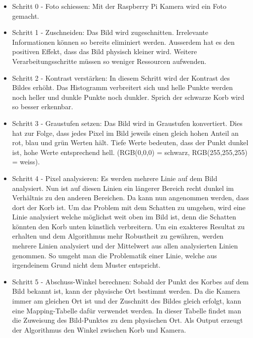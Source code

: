 \begin{itemize}
	\item Schritt 0 - Foto schiessen: Mit der Raspberry Pi Kamera wird ein Foto gemacht.
	
	\item Schritt 1 - Zuschneiden: Das Bild wird zugeschnitten. Irrelevante Informationen können so bereits eliminiert werden. Ausserdem hat es den positiven Effekt, dass das Bild physisch kleiner wird. Weitere Verarbeitungsschritte müssen so weniger Ressourcen aufwenden. 
	
	\item Schritt 2 - Kontrast verstärken: In diesem Schritt wird der Kontrast des Bildes erhöht. Das Histogramm verbreitert sich und helle Punkte werden noch heller und dunkle Punkte noch dunkler. Sprich der schwarze Korb wird so besser erkennbar. 
	
	\item Schritt 3 - Graustufen setzen: Das Bild wird in Graustufen konvertiert. Dies hat zur Folge, dass jedes Pixel im Bild jeweils einen gleich hohen Anteil an rot, blau und grün Werten hält. Tiefe Werte bedeuten, dass der Punkt dunkel ist, hohe Werte entsprechend hell. (RGB(0,0,0) = schwarz, RGB(255,255,255) = weiss).
	
	\item Schritt 4 - Pixel analysieren: Es werden mehrere Linie auf dem Bild analysiert. Nun ist auf diesen Linien ein längerer Bereich recht dunkel im Verhältnis zu den anderen Bereichen. Da kann nun angenommen werden, dass dort der Korb ist. Um das Problem mit dem Schatten zu umgehen, wird eine Linie analysiert welche möglichst weit oben im Bild ist, denn die Schatten könnten den Korb unten künstlich verbreitern. Um ein exakteres Resultat zu erhalten und dem Algorithmus mehr Robustheit zu gewähren, werden mehrere Linien analysiert und der Mittelwert aus allen analysierten Linien genommen. So umgeht man die Problematik einer Linie, welche aus irgendeinem Grund nicht dem Muster entspricht.
	
	\item Schritt 5 - Abschuss-Winkel berechnen: Sobald der Punkt des Korbes auf dem Bild bekannt ist, kann der physische Ort bestimmt werden. Da die Kamera immer am gleichen Ort ist und der Zuschnitt des Bildes gleich erfolgt, kann eine Mapping-Tabelle dafür verwendet werden. In dieser Tabelle findet man die Zuweisung des Bild-Punktes zu dem physischen Ort. Als Output erzeugt der Algorithmus den Winkel zwischen Korb und Kamera.
\end{itemize}

